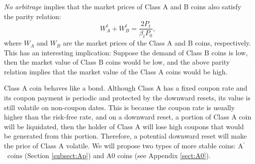 \documentclass[11pt]{article}%
\numberwithin{equation}{section}
\theoremstyle{plain}
\newcommand{\Ap}{A\ensuremath{^\prime}~}
\begin{document}
{\it No arbitrage} implies that the market prices of Class A and B coins also satisfy the parity relation:
$$W_A^t +W_B^t=\frac{2 P_t}{\beta_t P_0},$$
where $W_A$ and $W_B$ are the market prices of the Class A and B coins, respectively. This has an interesting implication: Suppose the demand of Class B coins is low, then the market value of Class B coins would be low, and the above parity relation implies that the market value of the Class A coins would be high.


Class A coin behaves like a bond. Although Class A has a fixed coupon rate and its coupon payment is periodic and protected by the downward resets, its value is still volatile on non-coupon dates.
This is because the coupon rate is usually higher than the risk-free rate, and on a downward reset, a portion of Class A coin will be liquidated, then the holder of Class A will lose high coupons that would be generated from this portion. Therefore, a potential downward reset will make the price of Class A volatile. We will propose two types of more stable coins: \Ap coins (Section \ref{subsect:Ap}) and A0 coins (see Appendix \ref{sect:A0}).
\end{document}

